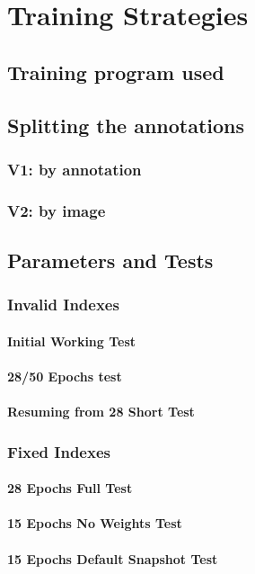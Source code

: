 \chapter{Training Strategies}\label{s:train}

\section{Training program used}

\section{Splitting the annotations}

\subsection{V1: by annotation}

\subsection{V2: by image}

\section{Parameters and Tests}

\subsection{Invalid Indexes}

\subsubsection{Initial Working Test}

\subsubsection{28/50 Epochs test}

\subsubsection{Resuming from 28 Short Test}

\subsection{Fixed Indexes}

\subsubsection{28 Epochs Full Test}

\subsubsection{15 Epochs No Weights Test}

\subsubsection{15 Epochs Default Snapshot Test}